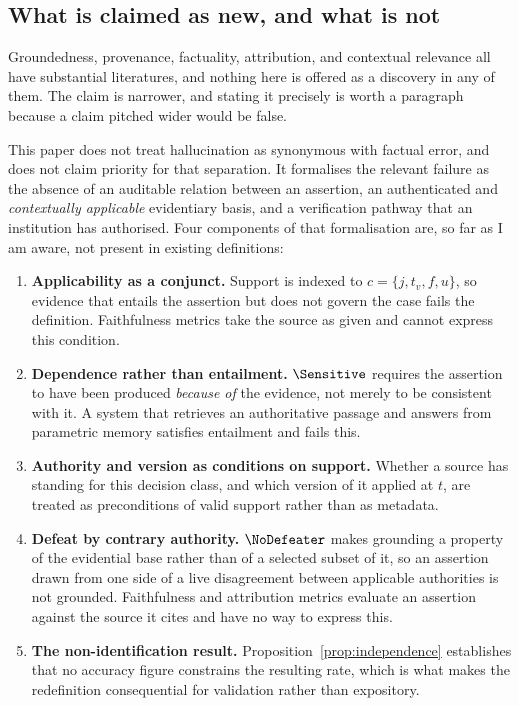 \subsection{What is claimed as new, and what is not}
\label{sec:novelty}

Groundedness, provenance, factuality, attribution, and contextual relevance all have
substantial literatures, and nothing here is offered as a discovery in any of them.
The claim is narrower, and stating it precisely is worth a paragraph because a claim
pitched wider would be false.

This paper does not treat hallucination as synonymous with factual error, and does
not claim priority for that separation. It formalises the relevant failure as the
absence of an auditable relation between an assertion, an authenticated and
\emph{contextually applicable} evidentiary basis, and a verification pathway that an
institution has authorised. Four components of that formalisation are, so far as I am
aware, not present in existing definitions:

\begin{enumerate}
  \item \textbf{Applicability as a conjunct.} Support is indexed to
        $c = \{j, t_v, f, u\}$, so evidence that entails the assertion but does not
        govern the case fails the definition. Faithfulness metrics take the source as
        given and cannot express this condition.
  \item \textbf{Dependence rather than entailment.} $\Sensitive$ requires the
        assertion to have been produced \emph{because of} the evidence, not merely to
        be consistent with it. A system that retrieves an authoritative passage and
        answers from parametric memory satisfies entailment and fails this.
  \item \textbf{Authority and version as conditions on support.} Whether a source has
        standing for this decision class, and which version of it applied at $t$, are
        treated as preconditions of valid support rather than as metadata.
  \item \textbf{Defeat by contrary authority.} $\NoDefeater$ makes grounding a
        property of the evidential base rather than of a selected subset of it, so an
        assertion drawn from one side of a live disagreement between applicable
        authorities is not grounded. Faithfulness and attribution metrics evaluate an
        assertion against the source it cites and have no way to express this.
  \item \textbf{The non-identification result.} Proposition~\ref{prop:independence}
        establishes that no accuracy figure constrains the resulting rate, which is
        what makes the redefinition consequential for validation rather than
        expository.
\end{enumerate}

